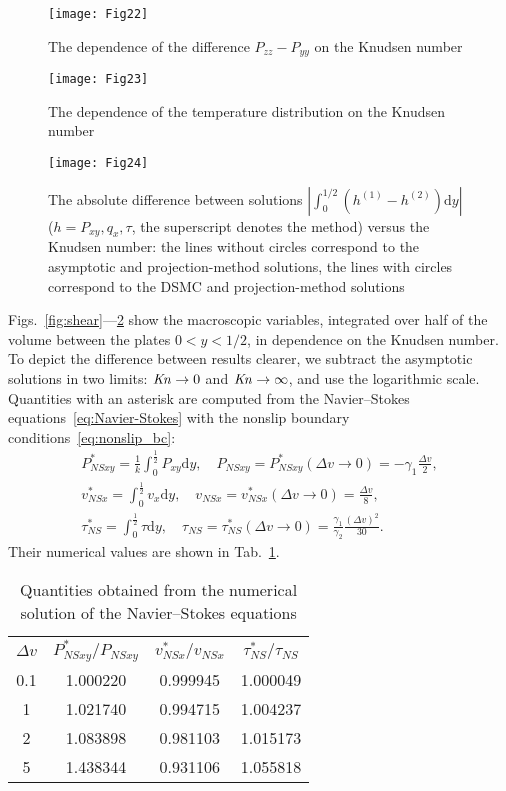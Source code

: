 \documentclass[]{jfm}
\newcommand{\Kn}{\mbox{\textit{Kn}}}
\newcommand{\NS}{N\!S}
\newcommand{\dd}{\mathrm{d}}
\begin{document}
\begin{figure}
    \centering
    \texttt{[image: Fig22]}
    \caption{The dependence of the difference \(P_{zz}-P_{yy}\) on the Knudsen number}
    \label{fig:pzz}
\end{figure}

\begin{figure}
    \centering
    \texttt{[image: Fig23]}
    \caption{The dependence of the temperature distribution on the Knudsen number}
    \label{fig:temp}
\end{figure}

\begin{figure}
    \centering
    \texttt{[image: Fig24]}
    \caption{The absolute difference between solutions \(|\int_0^{1/2} (h^{(1)}-h^{(2)})\dd{y}|\)
        (\(h = P_{xy}, q_x, \tau\), the superscript denotes the method) versus the Knudsen number:
        the lines without circles correspond to the asymptotic and projection-method solutions,
        the lines with circles correspond to the DSMC and projection-method solutions}
    \label{fig:diff}
\end{figure}

Figs.~\ref{fig:shear}---\ref{fig:temp} show the macroscopic variables,
integrated over half of the volume between the plates \(0<y<1/2\), in dependence on the Knudsen number.
To depict the difference between results clearer,
we subtract the asymptotic solutions in two limits: \(\Kn\to0\) and \(\Kn\to\infty\),
and use the logarithmic scale.
Quantities with an asterisk are computed from the Navier--Stokes equations~\eqref{eq:Navier-Stokes}
with the nonslip boundary conditions~\eqref{eq:nonslip_bc}:
\begin{gather*}
    P_{\NS xy}^* = \frac1k \int_0^\frac12 P_{xy} \dd{y}, \quad P_{\NS xy} = P_{\NS xy}^*(\Delta{v}\to0) = -\gamma_1\frac{\Delta{v}}2, \\
    v_{\NS x}^* = \int_0^\frac12 v_x \dd{y}, \quad v_{\NS x} = v_{\NS x}^*(\Delta{v}\to0) = \frac{\Delta{v}}8, \\
    \tau_{\NS}^* = \int_0^\frac12 \tau \dd{y}, \quad
        \tau_{\NS} = \tau_{\NS}^*(\Delta{v}\to0) = \frac{\gamma_1}{\gamma_2}\frac{(\Delta{v})^2}{30}.
\end{gather*}
Their numerical values are shown in Tab.~\ref{table:NS_params}.

\begin{table}
    \centering
    \begin{tabular}{cccc}
        \(\Delta{v}\) & \(\displaystyle P_{\NS xy}^*/P_{\NS xy}\) & \(\displaystyle v_{\NS x}^*/v_{\NS x}\) & \(\displaystyle \tau_{\NS}^*/\tau_{\NS}\) \\[3pt]
        0.1 & 1.000220 & 0.999945 & 1.000049 \\
          1 & 1.021740 & 0.994715 & 1.004237 \\
          2 & 1.083898 & 0.981103 & 1.015173 \\
          5 & 1.438344 & 0.931106 & 1.055818 \\
    \end{tabular}
    \caption{Quantities obtained from the numerical solution of the Navier--Stokes equations}
    \label{table:NS_params}
\end{table}
\end{document}
